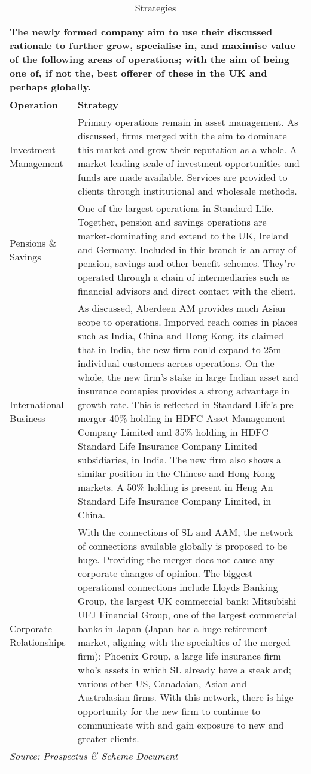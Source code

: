 \documentclass[11pt, english]{article}
\begin{document}
\begin{center}
        \scriptsize
\begin{longtable}{p{4cm}p{8.5cm}}
        \hline
        \multicolumn{2}{p{13cm}}{The newly formed company aim to use their discussed rationale to further grow, specialise in, and maximise value of the following areas of operations; with the aim of being one of, if not the, best offerer of these in the UK and perhaps globally.}\\
        \hline
        \textbf{Operation} & \textbf{Strategy}\\
        \hline
        Investment Management & Primary operations remain in asset management. As discussed, firms merged with the aim to dominate this market and grow their reputation as a whole. A market-leading scale of investment opportunities and funds are made available. Services are provided to clients through institutional and wholesale methods.\\
        Pensions \& Savings & One of the largest operations in Standard Life. Together, pension and savings operations are market-dominating and extend to the UK, Ireland and Germany. Included in this branch is an array of pension, savings and other benefit schemes. They're operated through a chain of intermediaries such as financial advisors and direct contact with the client.\\
        International Business & As discussed, Aberdeen AM provides much Asian scope to operations. Imporved reach comes in places such as India, China and Hong Kong. its claimed that in India, the new firm could expand to 25m individual customers across operations. On the whole, the new firm's stake in large Indian asset and insurance comapies provides a strong advantage in growth rate. This is reflected in Standard Life's pre-merger 40\% holding in HDFC Asset Management Company Limited and 35\% holding in HDFC Standard Life Insurance Company Limited subsidiaries, in India. The new firm also shows a similar position in the Chinese and Hong Kong markets. A 50\% holding is present in Heng An Standard Life Insurance Company Limited, in China.\\
        Corporate Relationships & With the connections of SL and AAM, the network of connections available globally is proposed to be huge. Providing the merger does not cause any corporate changes of opinion. The biggest operational connections include Lloyds Banking Group, the largest UK commercial bank; Mitsubishi UFJ Financial Group, one of the largest commercial banks in Japan (Japan has a huge retirement market, aligning with the specialties of the merged firm); Phoenix Group, a large life insurance firm who's assets in which SL already have a steak and; various other US, Canadaian, Asian and Australasian firms. With this network, there is hige opportunity for the new firm to continue to communicate with and gain exposure to new and greater clients.\\
        \hline
        \multicolumn{2}{l}{\textit{Source: Prospectus \& Scheme Document}}\\
        \hline
        \caption{Strategies}
\end{longtable}
\end{center}
\end{document}
